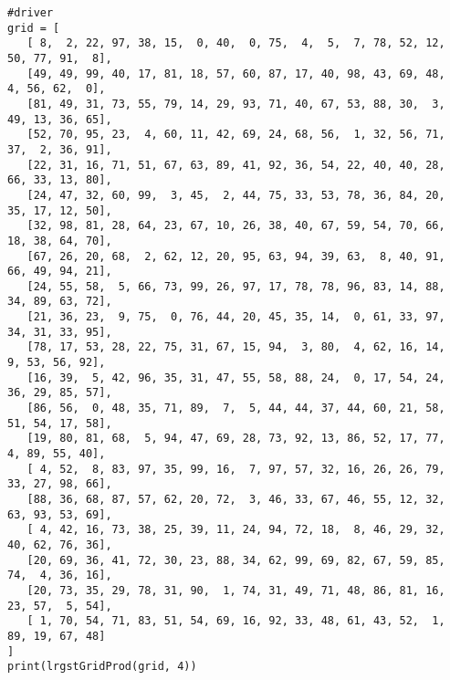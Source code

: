 \documentclass{article}
\begin{document}
\begin{verbatim}
#driver
grid = [
   [ 8,  2, 22, 97, 38, 15,  0, 40,  0, 75,  4,  5,  7, 78, 52, 12, 50, 77, 91,  8],
   [49, 49, 99, 40, 17, 81, 18, 57, 60, 87, 17, 40, 98, 43, 69, 48,  4, 56, 62,  0],
   [81, 49, 31, 73, 55, 79, 14, 29, 93, 71, 40, 67, 53, 88, 30,  3, 49, 13, 36, 65],
   [52, 70, 95, 23,  4, 60, 11, 42, 69, 24, 68, 56,  1, 32, 56, 71, 37,  2, 36, 91],
   [22, 31, 16, 71, 51, 67, 63, 89, 41, 92, 36, 54, 22, 40, 40, 28, 66, 33, 13, 80],
   [24, 47, 32, 60, 99,  3, 45,  2, 44, 75, 33, 53, 78, 36, 84, 20, 35, 17, 12, 50],
   [32, 98, 81, 28, 64, 23, 67, 10, 26, 38, 40, 67, 59, 54, 70, 66, 18, 38, 64, 70],
   [67, 26, 20, 68,  2, 62, 12, 20, 95, 63, 94, 39, 63,  8, 40, 91, 66, 49, 94, 21],
   [24, 55, 58,  5, 66, 73, 99, 26, 97, 17, 78, 78, 96, 83, 14, 88, 34, 89, 63, 72],
   [21, 36, 23,  9, 75,  0, 76, 44, 20, 45, 35, 14,  0, 61, 33, 97, 34, 31, 33, 95],
   [78, 17, 53, 28, 22, 75, 31, 67, 15, 94,  3, 80,  4, 62, 16, 14,  9, 53, 56, 92],
   [16, 39,  5, 42, 96, 35, 31, 47, 55, 58, 88, 24,  0, 17, 54, 24, 36, 29, 85, 57],
   [86, 56,  0, 48, 35, 71, 89,  7,  5, 44, 44, 37, 44, 60, 21, 58, 51, 54, 17, 58],
   [19, 80, 81, 68,  5, 94, 47, 69, 28, 73, 92, 13, 86, 52, 17, 77,  4, 89, 55, 40],
   [ 4, 52,  8, 83, 97, 35, 99, 16,  7, 97, 57, 32, 16, 26, 26, 79, 33, 27, 98, 66],
   [88, 36, 68, 87, 57, 62, 20, 72,  3, 46, 33, 67, 46, 55, 12, 32, 63, 93, 53, 69],
   [ 4, 42, 16, 73, 38, 25, 39, 11, 24, 94, 72, 18,  8, 46, 29, 32, 40, 62, 76, 36],
   [20, 69, 36, 41, 72, 30, 23, 88, 34, 62, 99, 69, 82, 67, 59, 85, 74,  4, 36, 16],
   [20, 73, 35, 29, 78, 31, 90,  1, 74, 31, 49, 71, 48, 86, 81, 16, 23, 57,  5, 54],
   [ 1, 70, 54, 71, 83, 51, 54, 69, 16, 92, 33, 48, 61, 43, 52,  1, 89, 19, 67, 48]
]
print(lrgstGridProd(grid, 4))
\end{verbatim}
\end{document}
